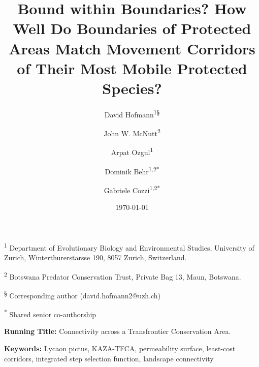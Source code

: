 \documentclass[abstract=on,10pt,a4paper,bibliography=totocnumbered]{article}
\title{Bound within Boundaries? How Well Do Boundaries of Protected Areas Match
Movement Corridors of Their Most Mobile Protected Species?}
\author{
  David Hofmann\textsuperscript{1\S} \and
  John W. McNutt\textsuperscript{2} \and
  Arpat Ozgul\textsuperscript{1} \and
  Dominik Behr\textsuperscript{1,2*} \and
  Gabriele Cozzi\textsuperscript{1,2*} \and
}
\date{\today}
\begin{document}



\maketitle

\begin{flushleft}

\vspace{0.5cm}

\textsuperscript{1} Department of Evolutionary Biology and Environmental
Studies, University of Zurich, Winterthurerstarsse 190, 8057 Zurich,
Switzerland.

\textsuperscript{2} Botswana Predator Conservation Trust, Private Bag 13, Maun,
Botswana.

\textsuperscript{\S} Corresponding author (david.hofmann2@uzh.ch)

\textsuperscript{*} Shared senior co-authorship

\vspace{4cm}

\textbf{Running Title:} Connectivity across a Transfrontier Conservation Area.

\vspace{0.5cm}

\textbf{Keywords:} Lycaon pictus, KAZA-TFCA, permeability surface, least-cost
corridors, integrated step selection function, landscape connectivity

\end{flushleft}
\end{document}
